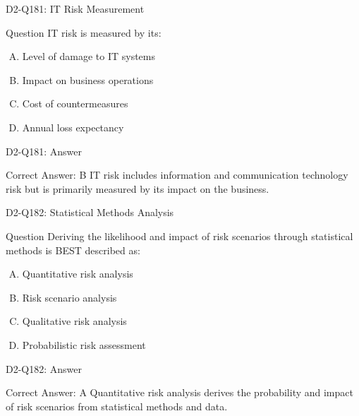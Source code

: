 \documentclass{beamer}
\begin{document}
	\begin{frame}{D2-Q181: IT Risk Measurement}
		\begin{block}{Question}
			IT risk is measured by its:
		\end{block}
		\begin{enumerate}[(A)]
			\item Level of damage to IT systems
			\item Impact on business operations
			\item Cost of countermeasures
			\item Annual loss expectancy
		\end{enumerate}
	\end{frame}
	\begin{frame}{D2-Q181: Answer}
		\begin{block}{Correct Answer: B}
			IT risk includes information and communication technology risk but is primarily measured by its impact on the business.
		\end{block}
	\end{frame}
	
	\begin{frame}{D2-Q182: Statistical Methods Analysis}
		\begin{block}{Question}
			Deriving the likelihood and impact of risk scenarios through statistical methods is BEST described as:
		\end{block}
		\begin{enumerate}[(A)]
			\item Quantitative risk analysis
			\item Risk scenario analysis
			\item Qualitative risk analysis
			\item Probabilistic risk assessment
		\end{enumerate}
	\end{frame}
	\begin{frame}{D2-Q182: Answer}
		\begin{block}{Correct Answer: A}
			Quantitative risk analysis derives the probability and impact of risk scenarios from statistical methods and data.
		\end{block}
	\end{frame}
	
\end{document}
